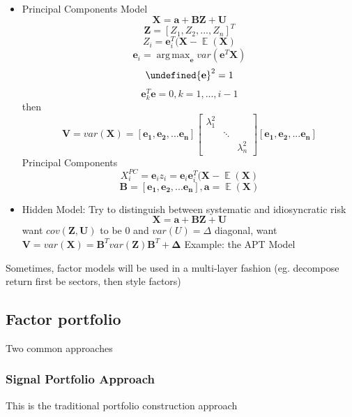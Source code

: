 \documentclass[11pt, openany]{book}              %
\let\norm\undefined %
\DeclarePairedDelimiter\norm{\lVert}{\rVert}
\DeclareMathOperator*{\argmax}{arg\,max}  %
\DeclareMathOperator{\E}{\mathbb{E}}
\begin{document}
\begin{itemize}
	\item Principal Components Model
	$$ \mathbf{X} =  \mathbf{a} +  \mathbf{BZ} +  \mathbf{U}$$
	 $$\mathbf{Z} = [Z_1, Z_2, ..., Z_n]^T$$
	 $$ Z_i = \mathbf{e}_i^T(\mathbf{X} - \E(\mathbf{X})$$
	 $$ \mathbf{e}_i = \argmax _{\mathbf{e}} var(\mathbf{e}^T\mathbf{X})$$
	 $$\norm{\mathbf{e}}^2 = 1$$
	 $$ \mathbf{e}_k^T \mathbf{e} = 0, k = 1,...,i-1$$
	 then 
	 $$\mathbf{V} = var(\mathbf{X}) = [\mathbf{e_1}, \mathbf{e_2},...\mathbf{e_n}]
	 \begin{bmatrix} 
  				 \lambda_1^2 & & \\ 
  				  & \ddots & \\
  				 &  & \lambda_n^2
	\end{bmatrix} [\mathbf{e_1}, \mathbf{e_2},...\mathbf{e_n}]
	 $$
	 Principal Components
	 $$X_i^{PC} = \mathbf{e}_i z_i = \mathbf{e}_i \mathbf{e}_i^ T(\mathbf{X} - \E( \mathbf{X})$$
	 $$\mathbf{B}= [\mathbf{e_1}, \mathbf{e_2},...\mathbf{e_n}], \mathbf{a} = \E( \mathbf{X})$$
	 
	\item Hidden Model: Try to distinguish between systematic and idiosyncratic risk 
	$$ \mathbf{X} =  \mathbf{a} +  \mathbf{BZ} +  \mathbf{U}$$ 
	want $cov(\mathbf{Z}, \mathbf{U})$ to be 0 and $var(U) = \Delta$ diagonal,
	want $\mathbf{V} = var(\mathbf{X}) = \mathbf{B}^T var(\mathbf{Z}) \mathbf{B}^T + \mathbf{\Delta}$
	\subitem Example: the APT Model
\end{itemize}


Sometimes, factor models will be used in a multi-layer fashion (eg. decompose return first be sectors, then style factors)

\subsection{Factor portfolio}

Two common approaches

\subsubsection{Signal Portfolio Approach}

This is the traditional portfolio construction approach
\end{document}
